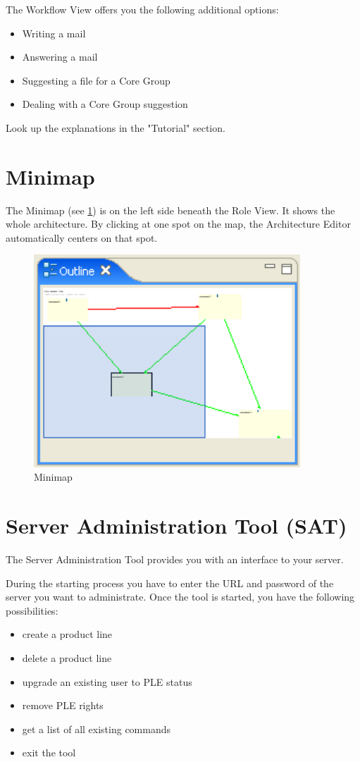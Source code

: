 The Workflow View offers you the following additional options:
\begin{itemize}
	\item Writing a mail
	\item Answering a mail
	\item Suggesting a file for a Core Group
	\item Dealing with a Core Group suggestion
\end{itemize}
Look up the explanations in the "Tutorial" section.

\section{Minimap}

The Minimap (see \ref{map}) is on the left side beneath the Role View. It shows the whole architecture.
By clicking at one spot on the map, the Architecture Editor automatically centers on that
spot. 

\begin{figure}[h!]
\begin{center}
\includegraphics[width=10cm]{outline.png}
   \caption{Minimap}
\label{map}
\end{center}
\end{figure}\par


\section{Server Administration Tool (SAT)}

The Server Administration Tool provides you with an interface to your server. \par
During the starting process you have to enter the URL and password of the server 
you want to administrate. Once the tool is started, you have the following 
possibilities:

\begin{itemize}
	\item create a product line
	\item delete a product line
	\item upgrade an existing user to PLE status
	\item remove PLE rights
	\item get a list of all existing commands
	\item exit the tool
\end{itemize}

